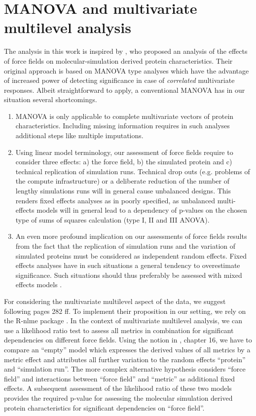 \documentclass{article}\usepackage[table]{xcolor}
\renewcommand{\$}{$} %
\begin{document}
\section{MANOVA and multivariate multilevel analysis}
The analysis in this work is inspired by \cite{Villa+etal:2007}, who
proposed an analysis of the effects of force fields on
molecular-simulation derived protein characteristics. Their original
approach is based on MANOVA type analyses which have the advantage of
increased power of detecting significance in case of {\em correlated}
multivariate responses. Albeit straightforward to apply, a
conventional MANOVA has in our situation several shortcomings.
\begin{enumerate}
\item MANOVA is only applicable to complete multivariate vectors of
  protein characteristics. Including missing information requires in
  such analyses additional steps like multiple imputations.
\item Using linear model terminology, our assessment of force fields
  require to consider three effects: a) the force field, b) the
  simulated protein and c) technical replication of simulation
  runs. Technical drop outs (e.g. problems of the compute
  infrastructure) or a deliberate reduction of the number of lengthy
  simulations runs will in general cause unbalanced designs. This
  renders fixed effects analyses as in \cite{Villa+etal:2007} poorly
  specified, as unbalanced multi-effects models will in general lead
  to a dependency of p-values on the chosen type of sums of squares
  calculation (type I, II and III ANOVA).
\item An even more profound implication on our assessments of force
  fields results from the fact that the replication of simulation runs
  and the variation of simulated proteins must be considered as
  independent random effects. Fixed effects analyses have in such
  situations a general tendency to overestimate significance. Such
  situations should thus preferably be assessed with mixed effects
  models \cite{Pinheiro+Bates:2000}.
\end{enumerate}
For considering the multivariate multilevel aspect of the data, we
suggest following \cite{Snijders+Bosker:2012} pages 282 ff. To
implement their proposition in our setting, we rely on the R-nlme
package \cite{Pinheiro+Bates:2000}. In the context of multivariate
multilevel analysis, we can use a likelihood ratio test
\cite{Mood+etal:1984} to assess all metrics in combination for
significant dependencies on different force fields. Using the notion
in \cite{Snijders+Bosker:2012}, chapter 16, we have to compare an
``empty'' model which expresses the derived values of all metrics by a
metric effect and attributes all further variation to the random
effects ``protein'' and ``simulation run''. The more complex
alternative hypothesis considers ``force field'' and interactions
between ``force field'' and ``metric'' as additional fixed effects. A
subsequent assessment of the likelihood ratio of these two models
provides the required p-value for assessing the molecular simulation
derived protein characteristics for significant dependencies on
``force field''.
\end{document}
